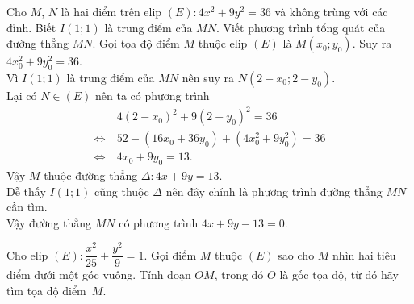 \begin{bt}%
Cho $M$, $N$ là hai điểm trên elip $\left(E\right)\colon 4x^2 + 9y^2 = 36$ và không trùng với các đỉnh. Biết $I\left(1;1\right)$ là trung điểm của $MN$. Viết phương trình tổng quát của đường thẳng $MN$.
\loigiai
{
Gọi tọa độ điểm $M$ thuộc elip $\left(E\right)$ là $M\left(x_0;y_0\right)$. Suy ra $4x_0^2 + 9y_0^2 = 36$. \\
Vì $I\left(1;1\right)$ là trung điểm của $MN$ nên suy ra $N\left(2-x_0;2-y_0\right)$.\\
Lại có $N\in\left(E\right)$ nên ta có phương trình
$$\begin{aligned}
& \ 4\left(2-x_0\right)^2 + 9\left(2-y_0\right)^2 = 36 \\
\Leftrightarrow & \ 52 - \left(16x_0 + 36y_0\right) +\left(4x_0^2 + 9y_0^2\right) = 36 \\
\Leftrightarrow & \ 4x_0 + 9y_0 = 13.
\end{aligned}$$
Vậy $M$ thuộc đường thẳng $\Delta\colon 4x+9y=13$. \\
Dễ thấy $I(1;1)$ cũng thuộc $\Delta$ nên đây chính là phương trình đường thẳng $MN$ cần tìm.\\
Vậy đường thẳng $MN$ có phương trình $4x + 9y - 13 = 0$.
}
\end{bt}

\begin{bt}%
	Cho elip $(E)\colon\dfrac{x^2}{25}+\dfrac{y^2}{9}=1$.
	Gọi điểm $M$ thuộc $(E)$ sao cho $M$ nhìn hai tiêu điểm dưới một góc vuông. Tính đoạn $OM$, trong đó $O$ là gốc tọa độ, từ đó hãy tìm tọa độ điểm~$M$.
\end{bt}

